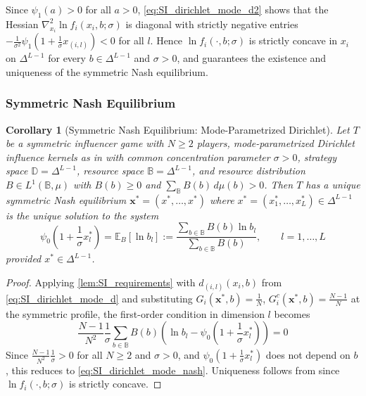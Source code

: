 \documentclass{article}
\newtheorem{corollary}{Corollary}[theorem]
\begin{document}
    Since $\psi_1(a) > 0$ for all $a > 0$, \cref{eq:SI_dirichlet_mode_d2} shows that the Hessian $\nabla_{x_i}^2 \ln f_i(x_i,b;\sigma)$ is diagonal with strictly negative entries $-\frac{1}{\sigma^2}\psi_1(1+\frac{1}{\sigma} x_{(i,l)}) < 0$ for all $l$.
    Hence $\ln f_i(\cdot,b;\sigma)$ is strictly concave in $x_i$ on $\Delta^{L-1}$ for every $b \in \Delta^{L-1}$ and $\sigma > 0$, and  guarantees the existence and uniqueness of the symmetric Nash equilibrium.

    \subsubsection{Symmetric Nash Equilibrium}\label{subsubsec:SI_dirichlet_mode_nash}

        \begin{corollary}[Symmetric Nash Equilibrium: Mode-Parametrized Dirichlet]\label{cor:SI_dirichlet_mode_nash}
            Let $T$ be a symmetric influencer game with $N \geq 2$ players, mode-parametrized Dirichlet influence kernels as in  with common concentration parameter $\sigma > 0$, strategy space $\mathbb{D} = \Delta^{L-1}$, resource space $\mathbb{B} = \Delta^{L-1}$, and resource distribution $B \in L^1(\mathbb{B},\mu)$ with $B(b) \geq 0$ and $\sum_{\mathbb{B}} B(b)\,d\mu(b) > 0$.
            Then $T$ has a unique symmetric Nash equilibrium $\mathbf{x}^* = (x^*,\ldots,x^*)$ where $x^* = (x_1^*,\ldots,x_L^*) \in \Delta^{L-1}$ is the unique solution to the system
            \begin{equation}
                \label{eq:SI_dirichlet_mode_nash}
                \psi_0\left(1+\frac{1}{\sigma} x_l^*\right)
                = \mathbb{E}_B[\ln b_l]
                := \frac{\sum_{b\in\mathbb{B}} B(b)\ln b_l}{\sum_{b\in\mathbb{B}} B(b)},
                \qquad l = 1,\ldots,L
            \end{equation}
            provided $x^* \in \Delta^{L-1}$.
        \end{corollary}

        \begin{proof}
            Applying \cref{lem:SI_requirements} with $d_{(i,l)}(x_i,b)$ from \cref{eq:SI_dirichlet_mode_d} and substituting $G_i(\mathbf{x}^*,b) = \frac{1}{N}$, $G_i^c(\mathbf{x}^*,b) = \frac{N-1}{N}$ at the symmetric profile, the first-order condition in dimension $l$ becomes
            \begin{equation}
                \frac{N-1}{N^2}\frac{1}{\sigma}\sum_{b\in\mathbb{B}} B(b)
                \left(\ln b_l - \psi_0\left(1+\frac{1}{\sigma} x_l^*\right)\right) = 0
            \end{equation}
            Since $\frac{N-1}{N^2}\frac{1}{\sigma} > 0$ for all $N \geq 2$ and $\sigma > 0$, and $\psi_0\left(1+\frac{1}{\sigma} x_l^*\right)$ does not depend on $b$, this reduces to \cref{eq:SI_dirichlet_mode_nash}. Uniqueness follows from  since $\ln f_i(\cdot,b;\sigma)$ is strictly concave.
        \end{proof}
\end{document}
